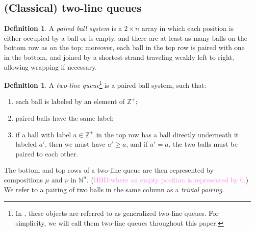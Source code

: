 \documentclass[12pt]{amsart}
\theoremstyle{definition}
\newtheorem{definition}[thm]{Definition}
\newcommand{\ZZ}{\mathbb Z}
\newcommand{\mcG}{\mathcal{G}}
\newcommand{\NN}{\mathbb N}
\def\LW#1{(\textcolor{teal}{LW:#1})}
\def\HBD#1{(\textcolor{violet}{HBD:#1})}
\begin{document}
\fi

\iffalse 
\subsection{(Classical) two-line queues}

\begin{definition}\label{def:paired_system}
A \emph{paired ball system} is a $2 \times n$ array
in which each position is either occupied by a ball or is empty,
and there are at least as many balls on the bottom row as on the top;
moreover, each ball in the top row is paired with one in the bottom, and joined by a shortest strand traveling weakly left to right, allowing wrapping if necessary.
\end{definition}


\begin{definition}\label{def:two-row}
A \emph{two-line queue}\footnote{In \cite{CorteelMandelshtamWilliams2022,BenDaliWilliams2025}, these objects are referred to as generalized two-line queues. For simplicity, we will call them two-line queues throughout this paper.} is a paired ball system,   such that:
\begin{enumerate}
\item each ball is labeled by an element of $\ZZ^+$;
\item paired balls have the same label;
\item\label{GMLQ:item1} if a ball with label $a\in \ZZ^+$ in the top row has a ball directly underneath it labeled $a'$, then
        we must have $a'\geq a$, and if $a'=a$, the two balls must be paired to each other. %
\end{enumerate}
The bottom and top rows of a two-line queue are then represented by  compositions $\mu$ and $\nu$ in $\NN^n$. \HBD{where an empty position is represented by 0.}  We refer to a pairing of two balls in the same column as a \emph{trivial pairing}.
\end{definition} 
\end{document}
